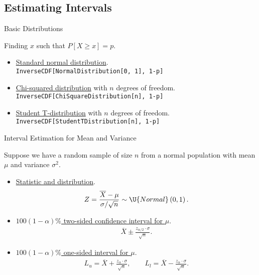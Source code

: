 \subsection{Estimating Intervals}

\begin{frame}{Basic Distributions}

Finding $x$ such that $P[X\geq x] = p$.
\begin{itemize}
	\item \underline{Standard normal distribution}. \\
	\texttt{InverseCDF[NormalDistribution[0, 1], 1-p]}
	\item \underline{Chi-squared distribution} with $n$ degrees of freedom. \\
	\texttt{InverseCDF[ChiSquareDistribution[n], 1-p]}
	\item \underline{Student T-distribution} with $n$ degrees of freedom. \\
	\texttt{InverseCDF[StudentTDistribution[n], 1-p]}
\end{itemize}

\end{frame}

\begin{frame}{Interval Estimation for Mean and Variance}

\justifying
{} Suppose we have a random sample of size $n$ from a normal population with  mean $\mu$ and  variance $\sigma^2$.
\begin{itemize}
	\item \underline{Statistic and distribution}.
	\begin{align*}
	Z = \frac{\overline{X} - \mu}{\sigma / \sqrt{n}} \sim \U{Normal}\left(0, 1 \right).
	\end{align*}
	\item \underline{$100(1-\alpha)\%$ two-sided confidence interval for $\mu$}.
	\begin{align*}
	\overline{X} \pm \frac{z_{\alpha/2}\cdot\sigma}{\sqrt{n}}.
	\end{align*}
	\item \underline{$100(1-\alpha)\%$ one-sided interval for $\mu$}.
	\begin{align*}
	L_u = \overline{X} + \frac{z_{\alpha}\cdot\sigma}{\sqrt{n}}, \qquad L_l = \overline{X} - \frac{z_{\alpha}\cdot \sigma}{\sqrt{n}}.
	\end{align*}
\end{itemize}

\end{frame}


